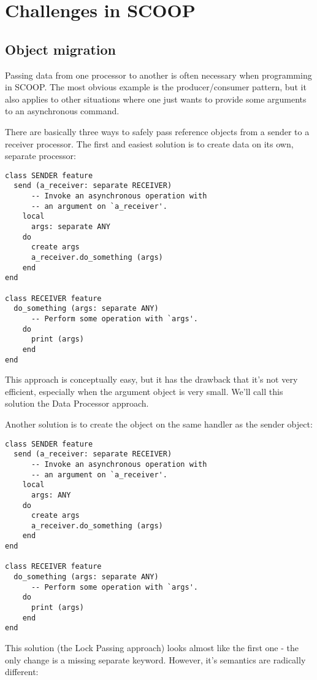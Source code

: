 \documentclass[a4paper,10pt]{article}
\begin{document}
\section{Challenges in SCOOP}

\subsection{Object migration}
\label{sec:object-migration}

Passing data from one processor to another is often necessary when programming in SCOOP.
The most obvious example is the producer/consumer pattern, but it also applies to other situations where one just wants to provide some arguments to an asynchronous command.


There are basically three ways to safely pass reference objects from a sender to a receiver processor.
The first and easiest solution is to create data on its own, separate processor: 
\begin{lstlisting}
class SENDER feature
  send (a_receiver: separate RECEIVER)
      -- Invoke an asynchronous operation with
      -- an argument on `a_receiver'.
    local
      args: separate ANY
    do
      create args
      a_receiver.do_something (args)
    end
end

class RECEIVER feature 
  do_something (args: separate ANY)
      -- Perform some operation with `args'.
    do
      print (args)
    end
end
\end{lstlisting}
This approach is conceptually easy, but it has the drawback that it's not very efficient, especially when the argument object is very small.
We'll call this solution the Data Processor approach.

Another solution is to create the object on the same handler as the sender object:
\begin{lstlisting}
class SENDER feature
  send (a_receiver: separate RECEIVER)
      -- Invoke an asynchronous operation with
      -- an argument on `a_receiver'.
    local
      args: ANY
    do
      create args
      a_receiver.do_something (args)
    end
end

class RECEIVER feature 
  do_something (args: separate ANY)
      -- Perform some operation with `args'.
    do
      print (args)
    end
end
\end{lstlisting}
This solution (the Lock Passing approach) looks almost like the first one - the only change is a missing separate keyword.
However, it's semantics are radically different:
\end{document}
